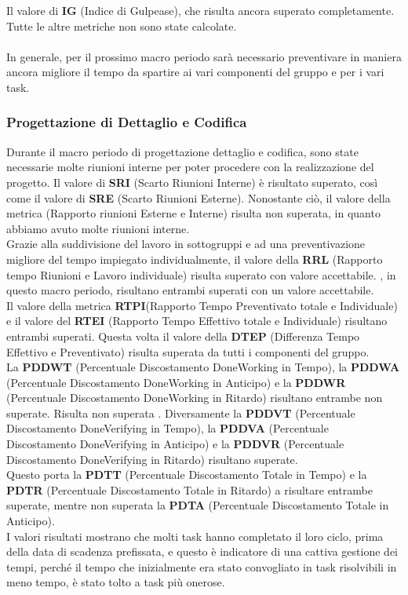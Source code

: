 Il valore di \textbf{IG} (Indice di Gulpease), che risulta ancora superato completamente.\\
Tutte le altre metriche non sono state calcolate.\\\\
In generale, per il prossimo macro periodo sarà necessario preventivare in maniera ancora migliore il tempo da spartire ai vari componenti del gruppo e per i vari task.

\subsubsection{Progettazione di Dettaglio e Codifica}
Durante il macro periodo di progettazione dettaglio e codifica, sono state necessarie molte riunioni interne per poter procedere con la realizzazione del progetto.
Il valore di \textbf{SRI} (Scarto Riunioni Interne) è risultato superato, così come il valore di \textbf{SRE} (Scarto Riunioni Esterne). Nonostante ciò, il valore della metrica (Rapporto riunioni Esterne e Interne) risulta non superata, in quanto abbiamo avuto molte riunioni interne.\\
Grazie alla suddivisione del lavoro in sottogruppi e ad una preventivazione migliore del tempo impiegato individualmente, il valore della \textbf{RRL} (Rapporto tempo Riunioni e Lavoro individuale) risulta superato con valore accettabile. , in questo macro periodo, risultano entrambi superati con un valore accettabile. \\
Il valore della metrica \textbf{RTPI}(Rapporto Tempo Preventivato totale e Individuale) e il valore del \textbf{RTEI} (Rapporto Tempo Effettivo totale e Individuale) risultano entrambi superati.
Questa volta il valore della \textbf{DTEP} (Differenza Tempo Effettivo e Preventivato) risulta superata da tutti i componenti del gruppo.\\
La \textbf{PDDWT} (Percentuale Discostamento DoneWorking in Tempo), la \textbf{PDDWA} (Percentuale Discostamento DoneWorking in Anticipo) e la \textbf{PDDWR} (Percentuale Discostamento DoneWorking in Ritardo) risultano entrambe non superate. Risulta non superata . Diversamente la \textbf{PDDVT} (Percentuale Discostamento DoneVerifying in Tempo), la \textbf{PDDVA} (Percentuale Discostamento DoneVerifying in Anticipo) e la \textbf{PDDVR} (Percentuale Discostamento DoneVerifying in Ritardo) risultano superate. \\ Questo porta la \textbf{PDTT} (Percentuale Discostamento Totale in Tempo) e la \textbf{PDTR} (Percentuale Discostamento Totale in Ritardo) a risultare entrambe superate, mentre non superata la \textbf{PDTA} (Percentuale Discostamento Totale in Anticipo).\\ I valori risultati mostrano che molti task hanno completato il loro ciclo, prima della data di scadenza prefissata, e questo è indicatore di una cattiva gestione dei tempi, perché il tempo che inizialmente era stato convogliato in task risolvibili in meno tempo, è stato tolto a task più onerose.\\
